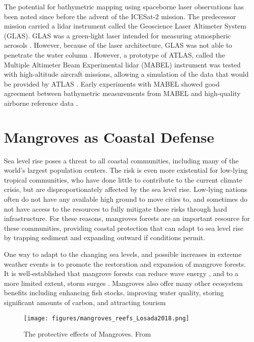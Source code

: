The potential for bathymetric mapping using spaceborne laser observations has been noted since before the advent of the ICESat-2 mission. The predecessor mission carried a lidar instrument called the Geoscience Laser Altimeter System (GLAS). GLAS was a green-light laser intended for measuring atmospheric aerosols \parencite{Abshire2005}. However, because of the laser architecture, GLAS was not able to penetrate the water column \parencite{Forfinski-Sarkozi2016}. However, a prototype of ATLAS, called the Multiple Altimeter Beam Experimental lidar (MABEL) instrument was tested with high-altitude aircraft missions, allowing a simulation of the data that would be provided by ATLAS \parencite{Mcgill2013}. Early experiments with MABEL showed good agreement between bathymetric measurements from MABEL and high-quality airborne reference data \parencite{Jasinski2016,Forfinski-Sarkozi2016}.

\section{Mangroves as Coastal Defense}

Sea level rise poses a threat to all coastal communities, including many of the world's largest population centers. The risk is even more existential for low-lying tropical communities, who have done little to contribute to the current climate crisis, but are disproportionately affected by the sea level rise. Low-lying nations often do not have any available high ground to move cities to, and sometimes do not have access to the resources to fully mitigate these risks through hard infrastructure. For these reasons, mangroves forests are an important resource for these communities, providing coastal protection that can adapt to sea level rise by trapping sediment and expanding outward if conditions permit.

One way to adapt to the changing sea levels, and possible increases in extreme weather events is to promote the restoration and expansion of mangrove forests. It is well-established that mangrove forests can reduce wave energy \parencite{Maza2019,Menendez2020,Hadi2003,Sanchez-Nunez2020}, and to a more limited extent, storm surges \parencite{Montgomery2019a,Chen2021,Mcivor2012}. Mangroves also offer many other ecosystem benefits including enhancing fish stocks, improving water quality, storing significant amounts of carbon, and attracting tourism \parencite{Atkinson2016b}

\begin{figure}[htbp]
      \centering
      \texttt{[image: figures/mangroves\_reefs\_Losada2018.png]}
      \caption{The protective effects of Mangroves. From \parencite{Losada2018}}
      \label{mangrove-protection-diagram}
\end{figure}

